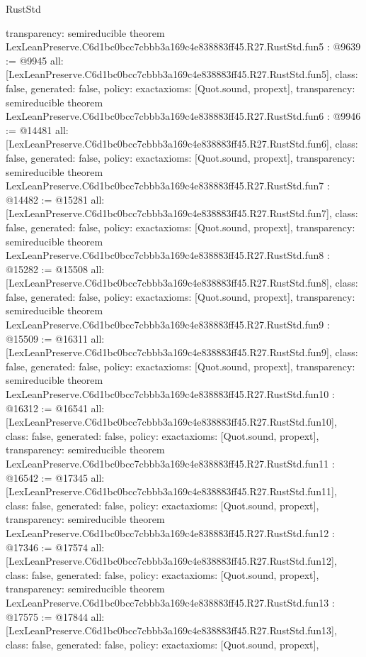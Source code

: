 \begin{lexlean}{RustStd}
\begin{coremodule}
{  transparency: semireducible
}
theorem LexLeanPreserve.C6d1bc0bcc7cbbb3a169c4e838883ff45.R27.RustStd.fun5 : @9639 := @9945 {
  all: [LexLeanPreserve.C6d1bc0bcc7cbbb3a169c4e838883ff45.R27.RustStd.fun5],
  class: false,
  generated: false,
  policy: exact{axioms: [Quot.sound, propext]},
  transparency: semireducible
}
theorem LexLeanPreserve.C6d1bc0bcc7cbbb3a169c4e838883ff45.R27.RustStd.fun6 : @9946 := @14481 {
  all: [LexLeanPreserve.C6d1bc0bcc7cbbb3a169c4e838883ff45.R27.RustStd.fun6],
  class: false,
  generated: false,
  policy: exact{axioms: [Quot.sound, propext]},
  transparency: semireducible
}
theorem LexLeanPreserve.C6d1bc0bcc7cbbb3a169c4e838883ff45.R27.RustStd.fun7 : @14482 := @15281 {
  all: [LexLeanPreserve.C6d1bc0bcc7cbbb3a169c4e838883ff45.R27.RustStd.fun7],
  class: false,
  generated: false,
  policy: exact{axioms: [Quot.sound, propext]},
  transparency: semireducible
}
theorem LexLeanPreserve.C6d1bc0bcc7cbbb3a169c4e838883ff45.R27.RustStd.fun8 : @15282 := @15508 {
  all: [LexLeanPreserve.C6d1bc0bcc7cbbb3a169c4e838883ff45.R27.RustStd.fun8],
  class: false,
  generated: false,
  policy: exact{axioms: [Quot.sound, propext]},
  transparency: semireducible
}
theorem LexLeanPreserve.C6d1bc0bcc7cbbb3a169c4e838883ff45.R27.RustStd.fun9 : @15509 := @16311 {
  all: [LexLeanPreserve.C6d1bc0bcc7cbbb3a169c4e838883ff45.R27.RustStd.fun9],
  class: false,
  generated: false,
  policy: exact{axioms: [Quot.sound, propext]},
  transparency: semireducible
}
theorem LexLeanPreserve.C6d1bc0bcc7cbbb3a169c4e838883ff45.R27.RustStd.fun10 : @16312 := @16541 {
  all: [LexLeanPreserve.C6d1bc0bcc7cbbb3a169c4e838883ff45.R27.RustStd.fun10],
  class: false,
  generated: false,
  policy: exact{axioms: [Quot.sound, propext]},
  transparency: semireducible
}
theorem LexLeanPreserve.C6d1bc0bcc7cbbb3a169c4e838883ff45.R27.RustStd.fun11 : @16542 := @17345 {
  all: [LexLeanPreserve.C6d1bc0bcc7cbbb3a169c4e838883ff45.R27.RustStd.fun11],
  class: false,
  generated: false,
  policy: exact{axioms: [Quot.sound, propext]},
  transparency: semireducible
}
theorem LexLeanPreserve.C6d1bc0bcc7cbbb3a169c4e838883ff45.R27.RustStd.fun12 : @17346 := @17574 {
  all: [LexLeanPreserve.C6d1bc0bcc7cbbb3a169c4e838883ff45.R27.RustStd.fun12],
  class: false,
  generated: false,
  policy: exact{axioms: [Quot.sound, propext]},
  transparency: semireducible
}
theorem LexLeanPreserve.C6d1bc0bcc7cbbb3a169c4e838883ff45.R27.RustStd.fun13 : @17575 := @17844 {
  all: [LexLeanPreserve.C6d1bc0bcc7cbbb3a169c4e838883ff45.R27.RustStd.fun13],
  class: false,
  generated: false,
  policy: exact{axioms: [Quot.sound, propext]},
}
\end{coremodule}
\end{lexlean}
